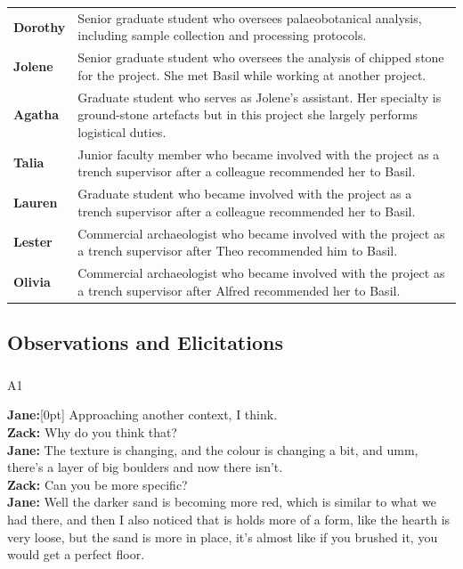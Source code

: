 \documentclass[
]{article}
\makeatletter
\let\oldsubparagraph\subparagraph
\renewcommand{\subparagraph}{
    \@ifstar
      \xxxSubParagraphStar
      \xxxSubParagraphNoStar
  }
\newcommand{\xxxSubParagraphStar}[1]{\oldsubparagraph*{#1}\mbox{}}
\newcommand{\xxxSubParagraphNoStar}[1]{\oldsubparagraph{#1}\mbox{}}
\newcommand{\paragraphnumber}[1]{\marginnote{\color{lightgray}\tiny{#1}}[0pt]}
\makeatother
\begin{document}
\begin{longtable}[]{@{}
  >{\raggedright\arraybackslash}p{}
  >{\raggedright\arraybackslash}p{}@{}}
\toprule\noalign{}
\endhead
\bottomrule\noalign{}
\endlastfoot
\textbf{Dorothy} & Senior graduate student who oversees palaeobotanical
analysis, including sample collection and processing protocols. \\
\textbf{Jolene} & Senior graduate student who oversees the analysis of
chipped stone for the project. She met Basil while working at another
project. \\
\textbf{Agatha} & Graduate student who serves as Jolene's assistant. Her
specialty is ground-stone artefacts but in this project she largely
performs logistical duties. \\
\textbf{Talia} & Junior faculty member who became involved with the
project as a trench supervisor after a colleague recommended her to
Basil. \\
\textbf{Lauren} & Graduate student who became involved with the project
as a trench supervisor after a colleague recommended her to Basil. \\
\textbf{Lester} & Commercial archaeologist who became involved with the
project as a trench supervisor after Theo recommended him to Basil. \\
\textbf{Olivia} & Commercial archaeologist who became involved with the
project as a trench supervisor after Alfred recommended her to Basil. \\
\end{longtable}

\subsection{Observations and
Elicitations}\label{observations-and-elicitations}

\subparagraph{A1}\label{sec-A1}

\textbf{Jane:}\paragraphnumber{[52]} Approaching another context, I
think.\\
\textbf{Zack:} Why do you think that?\\
\textbf{Jane:} The texture is changing, and the colour is changing a
bit, and umm, there's a layer of big boulders and now there isn't.\\
\textbf{Zack:} Can you be more specific?\\
\textbf{Jane:} Well the darker sand is becoming more red, which is
similar to what we had there, and then I also noticed that is holds more
of a form, like the hearth is very loose, but the sand is more in place,
it's almost like if you brushed it, you would get a perfect floor.
\end{document}
